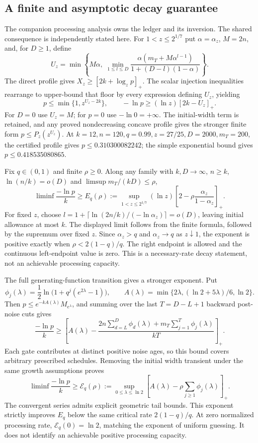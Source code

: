 \documentclass[11pt,a4paper]{article}
\begin{document}
\subsection{A finite and asymptotic decay guarantee}
The companion processing analysis owns the ledger and its inversion. The shared consequence is independently stated here. For $1<z\le2^{1/7}$ put $\alpha=\alpha_z$, $M=2n$, and, for $D\ge1$, define
\[
U_z=\min\left\{M\alpha,\;
\min_{1\le l\le D}\frac{\alpha(m_T+M\alpha^{l-1})}{1+(D-l)(1-\alpha)}\right\}.
\]
The direct profile gives $X_z\ge[2k+\log_zp]_+$. The scalar injection inequalities rearrange to upper-bound that floor by every expression defining $U_z$, yielding
\[
p\le\min\{1,z^{U_z-2k}\},\qquad
-\ln p\ge(\ln z)[2k-U_z]_+.
\]
For $D=0$ use $U_z=M$; for $p=0$ use $-\ln0=+\infty$. The initial-width term is retained, and any proved nondecreasing concave profile gives the stronger finite form $p\le P_z(z^{U_z})$. At $k=12,n=120,q=0.99,z=27/25,D=2000,m_T=200$, the certified profile gives $p\le0.310300082242$; the simple exponential bound gives $p\le0.418535080865$.

Fix $q\in(0,1)$ and finite $\rho\ge0$. Along any family with $k,D\to\infty$, $n\ge k$, $\ln(n/k)=o(D)$ and $\limsup m_T/(kD)\le\rho$,
\[
\liminf\frac{-\ln p}{k}\ge
E_q(\rho):=\sup_{1<z\le2^{1/7}}(\ln z)
\left[2-\rho\frac{\alpha_z}{1-\alpha_z}\right]_+.
\]
For fixed $z$, choose $l=1+\lceil\ln(2n/k)/(-\ln\alpha_z)\rceil=o(D)$, leaving initial allowance at most $k$. The displayed limit follows from the finite formula, followed by the supremum over fixed $z$. Since $\alpha_z>q$ and $\alpha_z\to q$ as $z\downarrow1$, the exponent is positive exactly when $\rho<2(1-q)/q$. The right endpoint is allowed and the continuous left-endpoint value is zero. This is a necessary-rate decay statement, not an achievable processing capacity.

The full generating-function transition gives a stronger exponent. Put
\[
\phi_j(\lambda)=\frac12\ln\bigl(1+q^j(e^{2\lambda}-1)\bigr),\qquad
A(\lambda)=\min\{2\lambda,(\ln2+5\lambda)/6,\ln2\}.
\]
Then $p\le e^{-kA(\lambda)}M_{e^\lambda}$, and summing over the last $T=D-L+1$ backward post-noise cuts gives
\[
\frac{-\ln p}{k}\ge\left[A(\lambda)-
\frac{2n\sum_{d=L}^D\phi_d(\lambda)+m_T\sum_{j=1}^T\phi_j(\lambda)}{kT}\right]_+.
\]
Each gate contributes at distinct positive noise ages, so this bound covers arbitrary prescribed schedules. Removing the initial width transient under the same growth assumptions proves
\[
\liminf\frac{-\ln p}{k}\ge\mathcal E_q(\rho):=
\sup_{0\le\lambda\le\ln2}\left[A(\lambda)-\rho\sum_{j\ge1}\phi_j(\lambda)\right]_+.
\]
The convergent series admits explicit geometric tail bounds. This exponent strictly improves $E_q$ below the same critical rate $2(1-q)/q$. At zero normalized processing rate, $\mathcal E_q(0)=\ln2$, matching the exponent of uniform guessing. It does not identify an achievable positive processing capacity.
\end{document}
